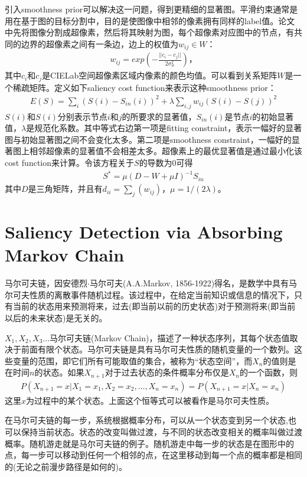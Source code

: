 \documentclass[12pt]{article}
\begin{document}
引入smoothness prior可以解决这一问题，得到更精细的显著图。平滑约束通常是用在基于图的目标分割中，目的是使图像中相邻的像素拥有同样的label值。论文中先将图像分割成超像素，然后将其映射为图，每个超像素对应图中的节点，有共同的边界的超像素之间有一条边，边上的权值为$w_{ij} \in W$：
\begin{align}
w_{ij} = exp\left(-\frac{||c_i-c_j||}{2\sigma_w^2}\right)，
\end{align}
其中$c_i$和$c_j$是CIELab空间超像素区域内像素的颜色均值。可以看到关系矩阵$W$是一个稀疏矩阵。定义如下saliency cost function来表示这种smoothness prior：
\begin{align}
E(S) = \sum_i(S(i)-S_{in}(i))^2+\lambda\sum_{i,j}w_{ij}(S(i)-S(j))^2
\end{align}
$S(i)$和$S(i)$分别表示节点$i$和$j$的所要求的显著值，$S_{in}(i)$是节点$i$的初始显著值，$\lambda$是规范化系数。其中等式右边第一项是fitting constraint，表示一幅好的显著图与初始显著图之间不会变化太多。第二项是smoothness constraint，一幅好的显著图上相邻超像素的显著值不会相差太多。超像素上的最优显著值是通过最小化该cost function来计算。令该方程关于$S$的导数为0可得
\begin{align}
S^* = \mu (D-W+\mu I)^{-1}S_{in}
\end{align}
其中$D$是三角矩阵，并且有$d_{ii} = \sum_j (w_{ij})$，$\mu = 1/(2\lambda)$。

\section{Saliency Detection via Absorbing Markov Chain}

马尔可夫链，因安德烈$\cdot$马尔可夫(A.A.Markov, 1856-1922)得名，是数学中具有马尔可夫性质的离散事件随机过程。该过程中，在给定当前知识或信息的情况下，只有当前的状态用来预测将来，过去(即当前以前的历史状态)对于预测将来(即当前以后的未来状态)是无关的。

$X_1, X_2, X_3\ldots$马尔可夫链(Markov Chain)，描述了一种状态序列，其每个状态值取决于前面有限个状态。马尔可夫链是具有马尔可夫性质的随机变量的一个数列。这些变量的范围，即它们所有可能取值的集合，被称为“状态空间”，而$X_n$的值则是在时间$n$的状态。如果$X_{n+1}$对于过去状态的条件概率分布仅是$X_n$的一个函数，则
\begin{align}
P(X_{n+1}=x|X_1=x_1, X_2=x_2, \ldots, X_n=x_n)=P(X_{n+1}=x|X_n=x_n)
\end{align}
这里$x$为过程中的某个状态。上面这个恒等式可以被看作是马尔可夫性质。

在马尔可夫链的每一步，系统根据概率分布，可以从一个状态变到另一个状态,也可以保持当前状态。状态的改变叫做过渡，与不同的状态改变相关的概率叫做过渡概率。随机游走就是马尔可夫链的例子。随机游走中每一步的状态是在图形中的点，每一步可以移动到任何一个相邻的点，在这里移动到每一个点的概率都是相同的(无论之前漫步路径是如何的)。
\end{document}
